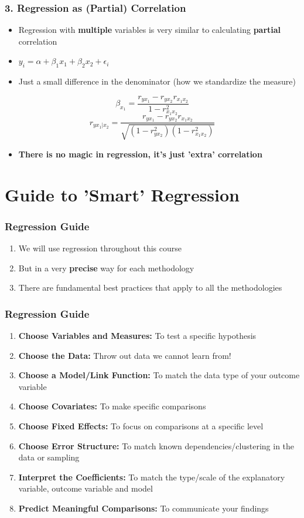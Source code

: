 \documentclass[xcolor=x11names,compress]{beamer}\usepackage[]{graphicx}\usepackage[]{color}
\renewcommand{\(}{\begin{columns}}
\renewcommand{\)}{\end{columns}}
\newcommand{\<}[1]{\begin{column}{#1}}
\renewcommand{\>}{\end{column}}
\begin{document}
\begin{frame}
\frametitle{3. Regression as (Partial) Correlation}
\begin{itemize}
\item Regression with \textbf{multiple} variables is very similar to calculating \textbf{partial} correlation
\pause
\item $y_i = \alpha + \beta_1 x_1 + \beta_2 x_2 +\epsilon_i$
\pause
\item Just a small difference in the denominator (how we standardize the measure)
\pause
\end{itemize}
$$\beta_{x_1} = \frac{r_{yx_1} - r_{yx_2}r_{x_1x_2}}{1-r^2_{x_1x_2}}$$
$$r_{yx_1|x_2} = \frac{r_{yx_1} - r_{yx_2}r_{x_1x_2}}{\sqrt{(1-r^2_{yx_2})(1-r^2_{x_1x_2})}}$$
\begin{itemize}
\item \textbf{There is no magic in regression, it's just 'extra' correlation}
\end{itemize}
\end{frame}



\section{Guide to 'Smart' Regression}

\begin{frame}
\frametitle{Regression Guide}
\begin{enumerate}
\item We will use regression throughout this course
\pause
\item But in a very \textbf{precise} way for each methodology
\pause
\item There are fundamental best practices that apply to all the methodologies
\end{enumerate}
\end{frame}

\begin{frame}
\frametitle{Regression Guide}
\begin{enumerate}
\item \textbf{Choose Variables and Measures:} To test a specific hypothesis
\pause
\item \textbf{Choose the Data:} Throw out data we cannot learn from!
\pause
\item \textbf{Choose a Model/Link Function:} To match the data type of your outcome variable
\pause
\item \textbf{Choose Covariates:} To make specific comparisons
\pause
\item \textbf{Choose Fixed Effects:} To focus on comparisons at a specific level
\pause
\item \textbf{Choose Error Structure:} To match known dependencies/clustering in the data or sampling
\pause
\item \textbf{Interpret the Coefficients:} To match the type/scale of the explanatory variable, outcome variable and model
\pause
\item \textbf{Predict Meaningful Comparisons:} To communicate your findings
\end{enumerate}
\end{frame}
\end{document}
